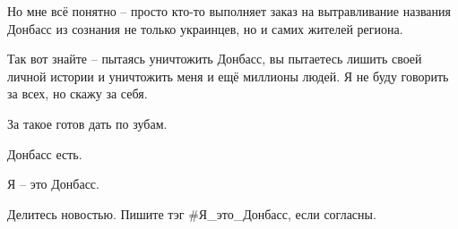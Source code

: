 Но мне всё понятно – просто кто-то выполняет заказ на вытравливание названия
Донбасс из сознания не только украинцев, но и самих жителей региона.

Так вот знайте – пытаясь уничтожить Донбасс, вы пытаетесь лишить своей личной
истории и уничтожить меня и ещё миллионы людей. Я не буду говорить за всех, но
скажу за себя.

За такое готов дать по зубам.

Донбасс есть.

Я – это Донбасс.

Делитесь новостью. Пишите тэг \#Я\_это\_Донбасс, если согласны.

